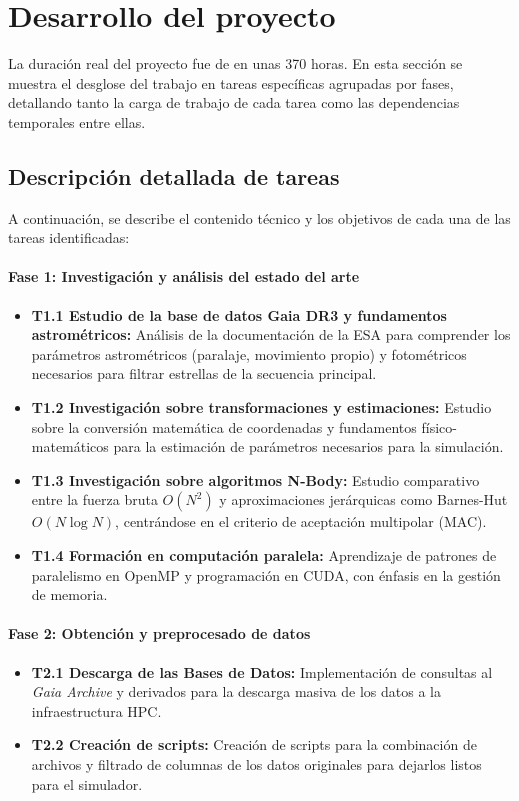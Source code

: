 \section{Desarrollo del proyecto}
\label{sec:estimacion-temporal}

La duración real del proyecto fue de en unas 370 horas.
En esta sección se muestra el desglose del trabajo en tareas específicas agrupadas por fases, detallando tanto la carga de trabajo de cada tarea como las dependencias temporales entre ellas.

\subsection{Descripción detallada de tareas}
\label{subsec:descripcion-tareas}

A continuación, se describe el contenido técnico y los objetivos de cada una de las tareas identificadas:

\paragraph{Fase 1: Investigación y análisis del estado del arte}
\begin{itemize}
    \item \textbf{T1.1 Estudio de la base de datos Gaia DR3 y fundamentos astrométricos:} Análisis de la documentación de la ESA para comprender los parámetros astrométricos (paralaje, movimiento propio) y fotométricos necesarios para filtrar estrellas de la secuencia principal.
    \item \textbf{T1.2 Investigación sobre transformaciones y estimaciones:} Estudio sobre la conversión matemática de coordenadas y fundamentos físico-matemáticos para la estimación de parámetros necesarios para la simulación.
    \item \textbf{T1.3 Investigación sobre algoritmos N-Body:} Estudio comparativo entre la fuerza bruta $O(N^2)$ y aproximaciones jerárquicas como Barnes-Hut $O(N \log N)$, centrándose en el criterio de aceptación multipolar (MAC).
    \item \textbf{T1.4 Formación en computación paralela:} Aprendizaje de patrones de paralelismo en OpenMP y programación en CUDA, con énfasis en la gestión de memoria.
\end{itemize}

\paragraph{Fase 2: Obtención y preprocesado de datos}
\begin{itemize}
    \item \textbf{T2.1 Descarga de las Bases de Datos:} Implementación de consultas al \textit{Gaia Archive} y derivados para la descarga masiva de los datos a la infraestructura HPC.
    \item \textbf{T2.2 Creación de scripts:} Creación de scripts para la combinación de archivos y filtrado de columnas de los datos originales para dejarlos listos para el simulador.
\end{itemize}


